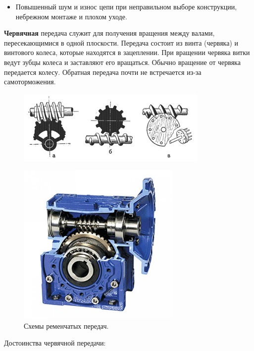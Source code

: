 \begin{itemize}
	\item Повышенный шум и износ цепи при неправильном выборе конструкции, небрежном монтаже и плохом уходе.\\
\end{itemize}

{\bfseries Червячная} передача служит для получения вращения между валами, пересекающимися в одной плоскости. Передача состоит из винта (червяка) и винтового колеса, которые находятся в зацеплении. При вращении червяка витки ведут зубцы колеса и заставляют его вращаться. Обычно вращение от червяка передается колесу. Обратная передача почти не встречается из-за самоторможения.

\begin{figure}[h!]
	\begin{center}
		\includegraphics[width=0.8\linewidth]{chapters/chapter5/images/11}
		\caption{}
		\label{ris:image5x10}
	\end{center}
\end{figure}
\clearpage
\begin{figure}[h!]
	\begin{center}
		\includegraphics[width=0.90\linewidth]{chapters/chapter5/images/12}
		\caption{Схемы ременчатых передач.}
		\label{ris:image5x11}
	\end{center}
\end{figure}	
\noindent Достоинства червячной передачи:	


